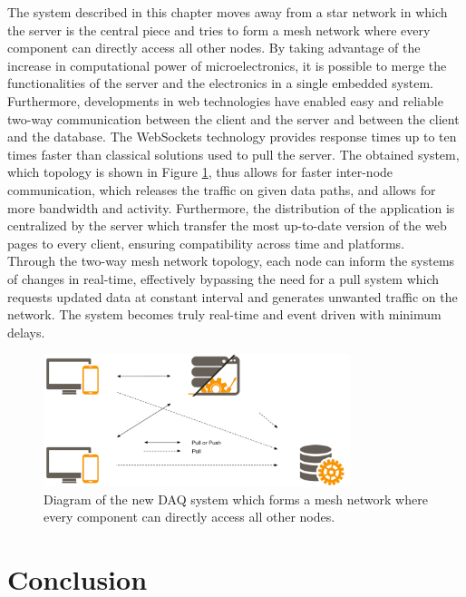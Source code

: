     The system described in this chapter moves away from a star network in which the server is the central piece and tries to form a mesh network where every component can directly access all other nodes. By taking advantage of the increase in computational power of microelectronics, it is possible to merge the functionalities of the server and the electronics in a single embedded system. Furthermore, developments in web technologies have enabled easy and reliable two-way communication between the client and the server and between the client and the database. The WebSockets technology provides response times up to ten times faster than classical solutions used to pull the server. The obtained system, which topology is shown in Figure \ref{fig:III-2-system-new}, thus allows for faster inter-node communication, which releases the traffic on given data paths, and allows for more bandwidth and activity. Furthermore, the distribution of the application is centralized by the server which transfer the most up-to-date version of the web pages to every client, ensuring compatibility across time and platforms. \\

    Through the two-way mesh network topology, each node can inform the systems of changes in real-time, effectively bypassing the need for a pull system which requests updated data at constant interval and generates unwanted traffic on the network. The system becomes truly real-time and event driven with minimum delays.

    \begin{figure}[h!]
      \centering
      \includegraphics[width=0.8\textwidth]{img/III-2-web-daq/new-sys.png}
      \caption{Diagram of the new DAQ system which forms a mesh network where every component can directly access all other nodes.}
      \label{fig:III-2-system-new}
    \end{figure}

  \section{Conclusion}

